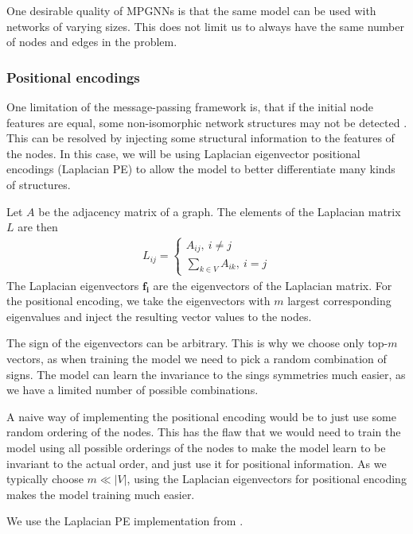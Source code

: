 \documentclass[english, 12pt, a4paper, sci, utf8, a-2b, online]{aaltothesis}
\begin{document}
One desirable quality of MPGNNs is that the same model can be used with networks of varying sizes. This does not limit us to always have the same number of nodes and edges in the problem.



\subsubsection{Positional encodings}

One limitation of the message-passing framework is, that if the initial node features are equal, some non-isomorphic network structures may not be detected \cite{repr-limit-2020}. This can be resolved by injecting some structural information to the features of the nodes. In this case, we will be using Laplacian eigenvector positional encodings (Laplacian PE) \cite{LaPE-first-introduction-2003} to allow the model to better differentiate many kinds of structures.

Let $A$ be the adjacency matrix of a graph. The elements of the Laplacian matrix $L$ are then
\begin{align}
    L_{ij} = \begin{cases}
        A_{ij},\ i \neq j\\
        \sum_{k \in V} A_{ik},\ i = j
    \end{cases}
\end{align}
The Laplacian eigenvectors $\mathbf{f_i}$ are the eigenvectors of the Laplacian matrix. For the positional encoding, we take the eigenvectors with $m$ largest corresponding eigenvalues and inject the resulting vector values to the nodes.

The sign of the eigenvectors can be arbitrary. This is why we choose only top-$m$ vectors, as when training the model we need to pick a random combination of signs. The model can learn the invariance to the sings symmetries much easier, as we have a limited number of possible combinations.

A naive way of implementing the positional encoding would be to just use some random ordering of the nodes. This has the flaw that we would need to train the model using all possible orderings of the nodes to make the model learn to be invariant to the actual order, and just use it for positional information. As we typically choose $m \ll |V|$, using the Laplacian eigenvectors for positional encoding makes the model training much easier.

We use the Laplacian PE implementation from \cite{LaPE-implementation-2020}.
\end{document}
